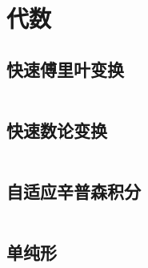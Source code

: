 \chapter{代数}
\section{快速傅里叶变换}
\inputminted{cpp}{\source/algebra/fast-fourier-transform.cpp}
\section{快速数论变换}
\inputminted{cpp}{\source/algebra/fast-numerical-transform.cpp}
\section{自适应辛普森积分}
\inputminted{cpp}{\source/algebra/adaptive-simpsons-method.cpp}
\section{单纯形}
\inputminted{cpp}{\source/algebra/simplex.cpp}
